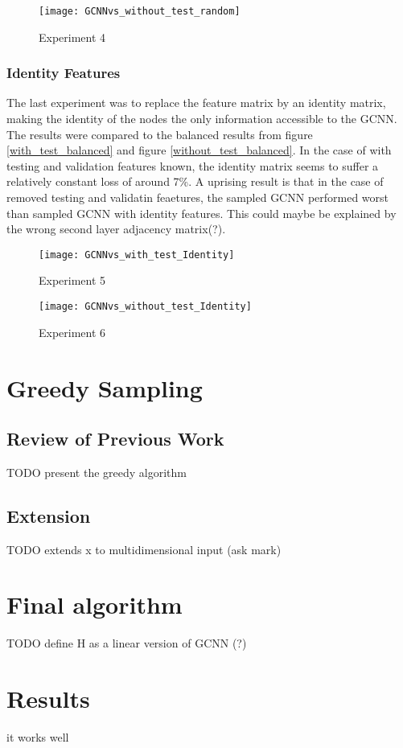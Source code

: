 \documentclass{article}
\begin{document}
\begin{figure}[h]
\centering
\texttt{[image: GCNNvs\_without\_test\_random]}
\caption{
Experiment 4
}
\label{without_test_unbalanced}
\end{figure}

\subsubsection*{Identity Features}
The last experiment was to replace the feature matrix by an identity matrix, making the identity of the nodes the only information accessible to the GCNN. The results were compared to the balanced results from figure \ref{with_test_balanced} and figure \ref{without_test_balanced}. In the case of with testing and validation features known, the identity matrix seems to suffer a relatively constant loss of around 7\%. A uprising result is that in the case of removed testing and validatin feaetures, the sampled GCNN performed worst than sampled GCNN with identity features. This could maybe be explained by the wrong second layer adjacency matrix(?).

\begin{figure}[h]
\centering
\texttt{[image: GCNNvs\_with\_test\_Identity]}
\caption{
Experiment 5
}
\label{with_test_balanced_Iden}
\end{figure}

\begin{figure}[h]
\centering
\texttt{[image: GCNNvs\_without\_test\_Identity]}
\caption{
Experiment 6
}
\label{without_test_balanced_Iden}
\end{figure}


\section*{Greedy Sampling}
\subsection*{Review of Previous Work}

TODO present the greedy algorithm

\subsection*{Extension}
TODO extends x to multidimensional input (ask mark)
\section*{Final algorithm}
TODO define H as a linear version of GCNN (?)
\section*{Results}
it works well
{}
\end{document}
